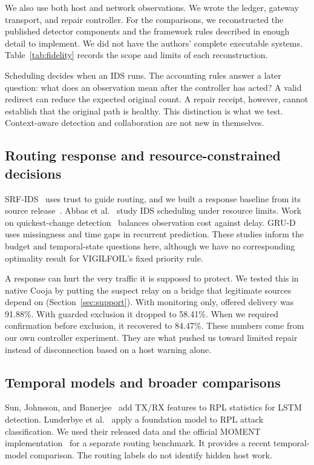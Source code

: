 \documentclass[journal]{IEEEtran}
\begin{document}
We also use both host and network observations. We wrote the ledger, gateway transport, and repair controller. For the comparisons, we reconstructed the published detector components and the framework rules described in enough detail to implement. We did not have the authors' complete executable systems. Table~\ref{tab:fidelity} records the scope and limits of each reconstruction.

Scheduling decides when an IDS runs. The accounting rules answer a later question: what does an observation mean after the controller has acted? A valid redirect can reduce the expected original count. A repair receipt, however, cannot establish that the original path is healthy. This distinction is what we test. Context-aware detection and collaboration are not new in themselves.

\subsection{Routing response and resource-constrained decisions}
SRF-IDS~\cite{srf} uses trust to guide routing, and we built a response baseline from its source release~\cite{srfcode}. Abbas et al.~\cite{abbas2015scheduling} study IDS scheduling under resource limits. Work on quickest-change detection~\cite{decusum} balances observation cost against delay. GRU-D~\cite{grud} uses missingness and time gaps in recurrent prediction. These studies inform the budget and temporal-state questions here, although we have no corresponding optimality result for VIGILFOIL's fixed priority rule.

A response can hurt the very traffic it is supposed to protect. We tested this in native Cooja by putting the suspect relay on a bridge that legitimate sources depend on (Section~\ref{sec:support}). With monitoring only, offered delivery was 91.88\%. With guarded exclusion it dropped to 58.41\%. When we required confirmation before exclusion, it recovered to 84.47\%. These numbers come from our own controller experiment. They are what pushed us toward limited repair instead of disconnection based on a host warning alone.

\subsection{Temporal models and broader comparisons}
Sun, Johnsson, and Banerjee~\cite{radio} add TX/RX features to RPL statistics for LSTM detection. Lunderbye et al.~\cite{foundation} apply a foundation model to RPL attack classification. We used their released data and the official MOMENT implementation~\cite{momentcode} for a separate routing benchmark. It provides a recent temporal-model comparison. The routing labels do not identify hidden host work.
\end{document}
